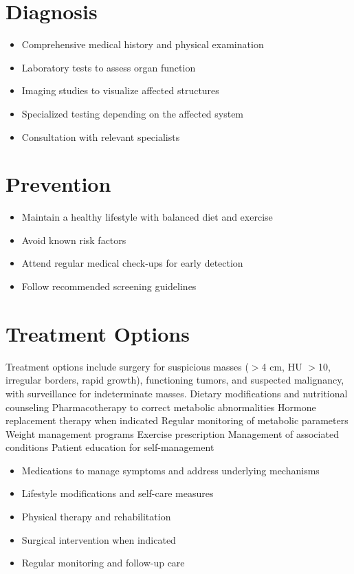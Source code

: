 \section{Diagnosis}
\begin{itemize}[noitemsep]
  \item Comprehensive medical history and physical examination
  \item Laboratory tests to assess organ function
  \item Imaging studies to visualize affected structures
  \item Specialized testing depending on the affected system
  \item Consultation with relevant specialists
\end{itemize}
\section{Prevention}
\begin{itemize}[noitemsep]
  \item Maintain a healthy lifestyle with balanced diet and exercise
  \item Avoid known risk factors
  \item Attend regular medical check-ups for early detection
  \item Follow recommended screening guidelines
\end{itemize}
\section{Treatment Options}
Treatment options include surgery for suspicious masses ($>$4 cm, HU $>$10, irregular borders, rapid growth), functioning tumors, and suspected malignancy, with surveillance for indeterminate masses. Dietary modifications and nutritional counseling Pharmacotherapy to correct metabolic abnormalities Hormone replacement therapy when indicated Regular monitoring of metabolic parameters Weight management programs Exercise prescription Management of associated conditions Patient education for self-management

\begin{itemize}[noitemsep]
  \item Medications to manage symptoms and address underlying mechanisms
  \item Lifestyle modifications and self-care measures
  \item Physical therapy and rehabilitation
  \item Surgical intervention when indicated
  \item Regular monitoring and follow-up care
\end{itemize}
